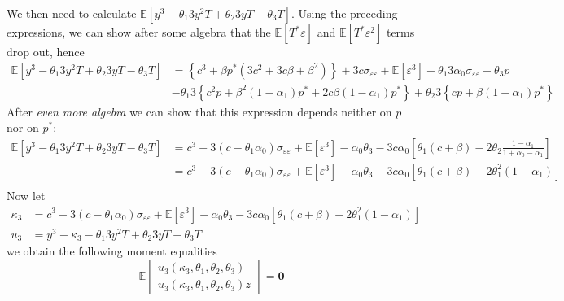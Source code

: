 \documentclass[12pt]{article}
\begin{document}
We then need to calculate $\mathbb{E}[y^3 - \theta_1 3 y^2T + \theta_2 3yT - \theta_3 T]$.
Using the preceding expressions, we can show after some algebra that the $\mathbb{E}[T^*\varepsilon]$ and $\mathbb{E}[T^*\varepsilon^2]$ terms drop out, hence
\begin{align*}
\mathbb{E}[y^3 - \theta_1 3 y^2T + \theta_2 3yT - \theta_3 T]&=
\left\{ c^3 + \beta p^* \left( 3c^2 + 3 c\beta + \beta^2 \right) \right\} + 3c \sigma_{\varepsilon\varepsilon} + \mathbb{E}[\varepsilon^3] - \theta_1 3 \alpha_0 \sigma_{\varepsilon\varepsilon} - \theta_3 p\\
&- \theta_1 3 \left\{ c^2p + \beta^2(1 - \alpha_1)p^* + 2 c \beta (1 - \alpha_1) p^* \right\} + \theta_2 3 \left\{ cp + \beta (1 - \alpha_1)p^* \right\}
\end{align*}
After \emph{even more algebra} we can show that this expression depends neither on $p$ nor on $p^*$:
\small
\begin{align*}
\mathbb{E}[y^3 - \theta_1 3 y^2T + \theta_2 3yT - \theta_3 T]&=
c^3 + 3\left( c - \theta_1 \alpha_0 \right) \sigma_{\varepsilon\varepsilon} + \mathbb{E}[\varepsilon^3] - \alpha_0 \theta_3 - 3 c \alpha_0 \left[ \theta_1 \left( c + \beta \right) - 2\theta_2 \frac{1 - \alpha_1}{1 + \alpha_0 - \alpha_1} \right]\\
&= c^3 + 3\left( c - \theta_1 \alpha_0 \right) \sigma_{\varepsilon\varepsilon} + \mathbb{E}[\varepsilon^3] - \alpha_0 \theta_3 - 3 c \alpha_0 \left[ \theta_1 \left( c + \beta \right) - 2\theta_1^2 (1 - \alpha_1) \right]\\
\end{align*}
\normalsize
Now let 
\begin{align*}
  \kappa_3 &= c^3 + 3\left( c - \theta_1 \alpha_0 \right) \sigma_{\varepsilon\varepsilon} + \mathbb{E}[\varepsilon^3] - \alpha_0 \theta_3 - 3 c \alpha_0 \left[ \theta_1 \left( c + \beta \right) - 2\theta_1^2 (1 - \alpha_1) \right]\\
  u_3 &= y^3 - \kappa_3 - \theta_1 3y^2 T + \theta_2 3yT - \theta_3 T
\end{align*}
we obtain the following moment equalities
\[
  \mathbb{E}\left[
  \begin{array}{l}
    u_3(\kappa_3, \theta_1, \theta_2, \theta_3)\\ 
    u_3(\kappa_3, \theta_1, \theta_2, \theta_3) z
  \end{array}
\right] = \mathbf{0}
\]
\end{document}
